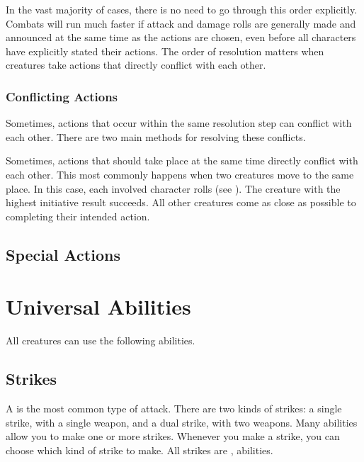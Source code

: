         In the vast majority of cases, there is no need to go through this order explicitly.
        Combats will run much faster if attack and damage rolls are generally made and announced at the same time as the actions are chosen, even before all characters have explicitly stated their actions.
        The order of resolution matters when creatures take actions that directly conflict with each other.

        \subsubsection{Conflicting Actions}\label{Conflicting Actions}

            Sometimes, actions that occur within the same resolution step can conflict with each other.
            There are two main methods for resolving these conflicts.

             Sometimes, actions that should take place at the same time directly conflict with each other.
            This most commonly happens when two creatures move to the same place.
            In this case, each involved character rolls  (see ).
            The creature with the highest initiative result succeeds.
            All other creatures come as close as possible to completing their intended action.

    \subsection{Special Actions}

\section{Universal Abilities}
    All creatures can use the following abilities.

    \subsection{Strikes}\label{Strikes}
        A  is the most common type of attack.
        There are two kinds of strikes: a single strike, with a single weapon, and a dual strike, with two weapons.
        Many abilities allow you to make one or more strikes.
        Whenever you make a strike, you can choose which kind of strike to make.
        All strikes are ,  abilities.

